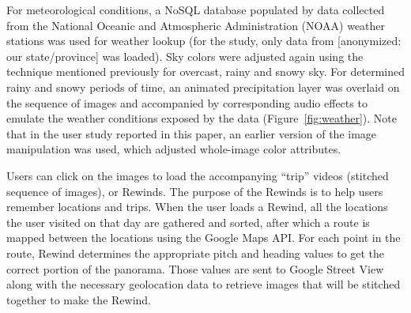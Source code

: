 \documentclass{sigchi}
\begin{document}
For meteorological conditions, a NoSQL database populated by data collected from the National Oceanic and Atmospheric Administration (NOAA) weather stations was used for weather lookup (for the study, only data from [anonymized: our state/province] was loaded). Sky colors were adjusted again using the technique mentioned previously for overcast, rainy and snowy sky. For determined rainy and snowy periods of time, an animated precipitation layer was overlaid on the sequence of images and accompanied by corresponding audio effects to emulate the weather conditions exposed by the data (Figure~\ref{fig:weather}). Note that in the user study reported in this paper, an earlier version of the image manipulation was used, which adjusted whole-image color attributes.



Users can click on the images to load the accompanying ``trip'' videos (stitched sequence of images), or Rewinds. The purpose of the Rewinds is to help users remember locations and trips.
When the user loads a Rewind, all the locations the user visited on that day are gathered and sorted, after which a route is mapped between the locations using the Google Maps API.
For each point in the route, Rewind determines the appropriate pitch and heading values to get the correct portion of the panorama. Those values are sent to Google Street View along with the necessary geolocation data to retrieve images that will be stitched together to make the Rewind.
\end{document}
